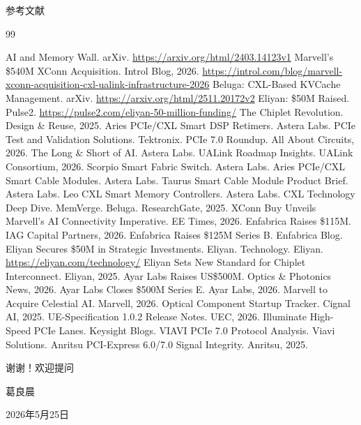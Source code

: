 \documentclass[aspectratio=169, 10pt, UTF8]{ctexbeamer}
\begin{document}
\begin{frame}[allowframebreaks]{参考文献}
  \begin{thebibliography}{99}
    \beamertemplatearticlebibitems

     AI and Memory Wall. arXiv. \url{https://arxiv.org/html/2403.14123v1}
     Marvell's \$540M XConn Acquisition. Introl Blog, 2026. \url{https://introl.com/blog/marvell-xconn-acquisition-cxl-ualink-infrastructure-2026}
     Beluga: CXL-Based KVCache Management. arXiv. \url{https://arxiv.org/html/2511.20172v2}
     Eliyan: \$50M Raised. Pulse2. \url{https://pulse2.com/eliyan-50-million-funding/}
     The Chiplet Revolution. Design \& Reuse, 2025.
     Aries PCIe/CXL Smart DSP Retimers. Astera Labs.
     PCIe Test and Validation Solutions. Tektronix.
     PCIe 7.0 Roundup. All About Circuits, 2026.
     The Long \& Short of AI. Astera Labs.
     UALink Roadmap Insights. UALink Consortium, 2026.
     Scorpio Smart Fabric Switch. Astera Labs.
     Aries PCIe/CXL Smart Cable Modules. Astera Labs.
     Taurus Smart Cable Module Product Brief. Astera Labs.
     Leo CXL Smart Memory Controllers. Astera Labs.
     CXL Technology Deep Dive. MemVerge.
     Beluga. ResearchGate, 2025.
     XConn Buy Unveils Marvell's AI Connectivity Imperative. EE Times, 2026.
     Enfabrica Raises \$115M. IAG Capital Partners, 2026.
     Enfabrica Raises \$125M Series B. Enfabrica Blog.
     Eliyan Secures \$50M in Strategic Investments. Eliyan.
     Technology. Eliyan. \url{https://eliyan.com/technology/}
     Eliyan Sets New Standard for Chiplet Interconnect. Eliyan, 2025.
     Ayar Labs Raises US\$500M. Optics \& Photonics News, 2026.
     Ayar Labs Closes \$500M Series E. Ayar Labs, 2026.
     Marvell to Acquire Celestial AI. Marvell, 2026.
     Optical Component Startup Tracker. Cignal AI, 2025.
     UE-Specification 1.0.2 Release Notes. UEC, 2026.
     Illuminate High-Speed PCIe Lanes. Keysight Blogs.
     VIAVI PCIe 7.0 Protocol Analysis. Viavi Solutions.
     Anritsu PCI-Express 6.0/7.0 Signal Integrity. Anritsu, 2025.
  \end{thebibliography}
\end{frame}

\begin{frame}[plain]
  \centering
  \vfill
  {\huge\color{ieeeBlue} 谢谢！欢迎提问}

  \vspace{20pt}
  {\large 葛良晨}

  \vspace{8pt}
  {\large 2026年5月25日}
  \vfill
\end{frame}
\end{document}

